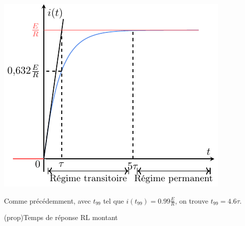 \documentclass[../../main/main.tex]{subfiles}
\begin{document}
\begin{tcb*}[label=impl:déterm, sidebyside, righthand ratio=.4]
{    }{%
      \includegraphics[width=\linewidth]{carac_rl-tau}
    }%
  \end{tcb*}

Comme précédemment, avec $t_{99}$ tel que $i(t_{99}) = \num{0.99}\frac{E}{R}$,
on trouve $t_{99} = \num{4.6}\tau$.
\begin{tcb}(prop){Temps de réponse RL montant}
	{}
\end{tcb}
\end{document}
